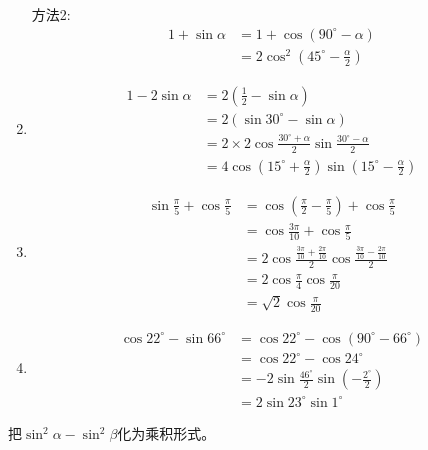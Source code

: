 \begin{solution}
\begin{enumerate}
方法2: 
\[\begin{split}
    1+\sin\alpha &=1+\cos(90^{\circ}-\alpha)\\
    &=2\cos^2\left(45^{\circ}-\frac{\alpha}{2}\right)
\end{split}\]
\item \[\begin{split}
    1-2\sin\alpha &=2\left(\frac{1}{2}-\sin\alpha\right)\\
    &=2(\sin30^{\circ}-\sin\alpha)\\
    &=2\times 2\cos\frac{30^{\circ}+\alpha}{2}\sin\frac{30^{\circ}-\alpha}{2}\\
    &=4\cos\left(15^{\circ}+\frac{\alpha}{2}\right)\sin \left(15^{\circ}-\frac{\alpha}{2}\right)
\end{split}\]    
\item \[\begin{split}
    \sin\frac{\pi}{5}+\cos\frac{\pi}{5}&= \cos\left(\frac{\pi}{2}-\frac{\pi}{5}\right)+\cos\frac{\pi}{5}\\
    &=\cos\frac{3\pi}{10}+\cos\frac{\pi}{5}\\
    &=2\cos\frac{\frac{3\pi}{10}+\frac{2\pi}{10}}{2}\cos\frac{\frac{3\pi}{10}-\frac{2\pi}{10}}{2} \\
    &=2\cos\frac{\pi}{4}\cos\frac{\pi}{20}\\
    &=\sqrt{2}\cos\frac{\pi}{20}
\end{split}\]    
\item \[\begin{split}
    \cos22^{\circ}-\sin 66^{\circ}&=\cos22^{\circ}-\cos(90^{\circ}-66^{\circ}) \\
    &=\cos22^{\circ}-\cos 24^{\circ}\\
    &=-2\sin\frac{46^{\circ}}{2}\sin\left(-\frac{2^{\circ}}{2}\right)\\
    &=2\sin 23^{\circ}\sin 1^{\circ}
\end{split}\]    
\end{enumerate}
\end{solution}


\begin{example}
    把$\sin^2\alpha-\sin^2\beta$化为乘积形式。
\end{example}


